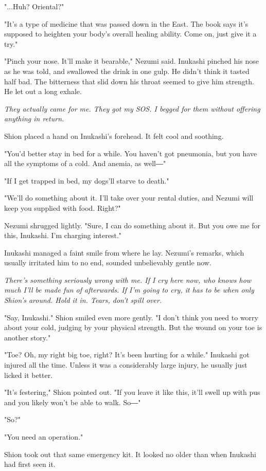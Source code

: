 "...Huh? Oriental?"

"It's a type of medicine that was passed down in the East. The book says
it's supposed to heighten your body's overall healing ability. Come on,
just give it a try."

"Pinch your nose. It'll make it bearable," Nezumi said. Inukashi pinched
his nose as he was told, and swallowed the drink in one gulp. He didn't
think it tasted half bad. The bitterness that slid down his throat
seemed to give him strength. He let out a long exhale.

\emph{They actually came for me. They got my SOS. I begged for them without
offering anything in return.}

Shion placed a hand on Inukashi's forehead. It felt cool and soothing.

"You'd better stay in bed for a while. You haven't got pneumonia, but
you have all the symptoms of a cold. And anemia, as well―"

"If I get trapped in bed, my dogs'll starve to death."

"We'll do something about it. I'll take over your rental duties, and
Nezumi will keep you supplied with food. Right?"

Nezumi shrugged lightly. "Sure, I can do something about it. But you owe
me for this, Inukashi. I'm charging interest."

Inukashi managed a faint smile from where he lay. Nezumi's remarks,
which usually irritated him to no end, sounded unbelievably gentle now.

\emph{There's something seriously wrong with me. If I cry here now, who knows
how much I'll be made fun of afterwards. If I'm going to cry, it has to
be when only Shion's around. Hold it in. Tears, don't spill over.}

"Say, Inukashi." Shion smiled even more gently. "I don't think you need
to worry about your cold, judging by your physical strength. But the
wound on your toe is another story."

"Toe? Oh, my right big toe, right? It's been hurting for a while."
Inukashi got injured all the time. Unless it was a considerably large
injury, he usually just licked it better.

"It's festering," Shion pointed out. "If you leave it like this, it'll
swell up with pus and you likely won't be able to walk. So―"

"So?"

"You need an operation."

Shion took out that same emergency kit. It looked no older than when
Inukashi had first seen it.

